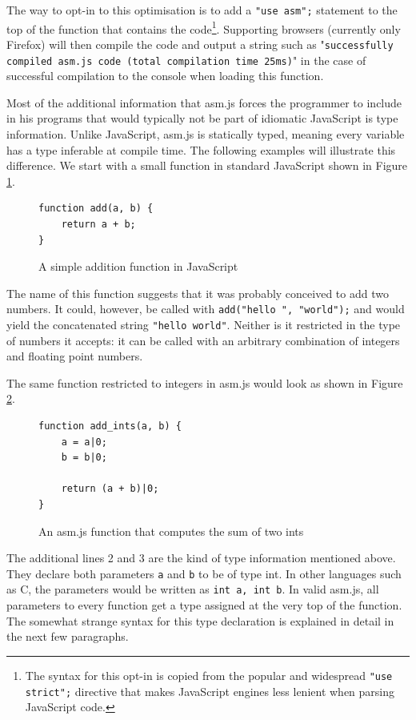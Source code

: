 \documentclass[11pt]{report}
\begin{document}
The way to opt-in to this optimisation is to add a \texttt{"use asm";} statement to the top of the function that contains the code\footnote{The syntax for this opt-in is copied from the popular and widespread \texttt{"use strict";} directive that makes JavaScript engines less lenient when parsing JavaScript code.}. Supporting browsers (currently only Firefox) will then compile the code and output a string such as "\texttt{successfully compiled asm.js code (total compilation time 25ms)}" in the case of successful compilation to the console when loading this function.

Most of the additional information that asm.js forces the programmer to include in his programs that would typically not be part of idiomatic JavaScript is type information. Unlike JavaScript, asm.js is statically typed, meaning every variable has a type inferable at compile time. The following examples will illustrate this difference. We start with a small function in standard JavaScript shown in Figure \ref{jssimplefunc}.

\begin{figure}[ht]
\begin{lstlisting}
function add(a, b) {
    return a + b;
}
\end{lstlisting}
\caption{A simple addition function in JavaScript}
\label{jssimplefunc}
\end{figure}

The name of this function suggests that it was probably conceived to add two numbers. It could, however, be called with \texttt{add("hello ", "world");} and would yield the concatenated string \texttt{"hello world"}. Neither is it restricted in the type of numbers it accepts: it can be called with an arbitrary combination of integers and floating point numbers.

The same function restricted to integers in asm.js would look as shown in Figure \ref{asmjsadder}.

\begin{figure}[ht]
\begin{lstlisting}
function add_ints(a, b) {
    a = a|0;
    b = b|0;
    
    return (a + b)|0;
}
\end{lstlisting}
\caption{An asm.js function that computes the sum of two ints}
\label{asmjsadder}
\end{figure}

The additional lines 2 and 3 are the kind of type information mentioned above. They declare both parameters \texttt{a} and \texttt{b} to be of type int. In other languages such as C, the parameters would be written as \texttt{int a, int b}. In valid asm.js, all parameters to every function get a type assigned at the very top of the function. The somewhat strange syntax for this type declaration is explained in detail in the next few paragraphs.
\end{document}
